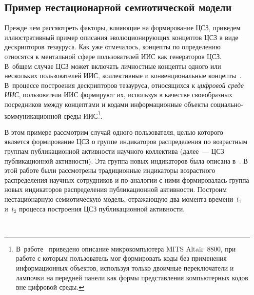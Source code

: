 \begin{multicols}{2}
\vspace*{-4pt}

\section{Пример нестационарной семиотической модели}
\vspace*{-2pt}

   Прежде чем рассмотреть факторы, влияющие на формирование ЦСЗ, приведем 
иллюстративный пример описания эволюционирующих концептов ЦСЗ в виде дескрипторов 
тезауруса. Как уже отмечалось, концепты по определению относятся к ментальной сфере 
пользователей ИИС как генераторов ЦСЗ. В~общем случае ЦСЗ может включать личностные 
концепты одного или нескольких пользователей ИИС, коллективные и конвенциональные 
концепты~\cite{7zat, 11zat}. В~процессе построения дескрипторов тезауруса, 
относящихся к \textit{цифровой среде ИИС}, пользователи ИИС формируют их, используя в 
качестве своеобразных посредников между концептами и кодами информационные объекты 
социально-ком\-му\-ни\-ка\-ци\-он\-ной среды ИИС\footnote{В~работе~\cite{2zat} приведено описание 
микрокомпьютера MITS Altair~8800, при работе с которым пользователь мог формировать коды без 
применения информационных объектов, используя только двоичные переключатели и лампочки на передней 
панели как формы представления компьютерных кодов вне цифровой среды.}.
   
   В этом примере рассмотрим случай одного пользователя, целью которого является 
формирование ЦСЗ о группе индикаторов распределения по возрастным группам 
публикационной активности научного коллектива (далее~--- ЦСЗ публикационной 
активности). Эта группа новых индикаторов была описана в~\cite{7zat}. В этой работе 
были рассмотрены традиционные индикаторы возрастного распределения научных 
сотрудников и по аналогии с ними формировалась группа новых индикаторов распределения 
публикационной активности. Построим нестационарную семиотическую модель, 
отра\-жа\-ющую два момента времени~$t_1$ и~$t_2$ процесса построения ЦСЗ публикационной 
активности.
\pagebreak
\end{multicols}

\begin{figure} %
\begin{center}
\vspace*{1pt}
\mbox{%
\epsfxsize=162.621mm
}
\end{center}
\vspace*{-3pt}
\vspace*{9pt}
\end{figure}

